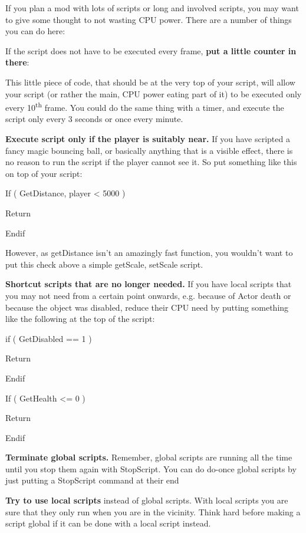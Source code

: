 If you plan a mod with lots of scripts or long and involved scripts, you
may want to give some thought to not wasting CPU power. There are a
number of things you can do here:

If the script does not have to be executed every frame, \textbf{put a
little counter in there}:



This little piece of code, that should be at the very top of your
script, will allow your script (or rather the main, CPU power eating
part of it) to be executed only every 10\textsuperscript{th} frame. You
could do the same thing with a timer, and execute the script only every
3 seconds or once every minute.

\textbf{Execute script only if the player is suitably near.} If you have
scripted a fancy magic bouncing ball, or basically anything that is a
visible effect, there is no reason to run the script if the player
cannot see it. So put something like this on top of your script:

If ( GetDistance, player < 5000 )

Return

Endif

However, as getDistance isn't an amazingly fast function, you wouldn't
want to put this check above a simple getScale, setScale script.

\textbf{Shortcut scripts that are no longer needed.} If you have local
scripts that you may not need from a certain point onwards, e.g. because
of Actor death or because the object was disabled, reduce their CPU need
by putting something like the following at the top of the script:

if ( GetDisabled == 1 )

Return

Endif

If ( GetHealth <= 0 )

Return

Endif

\textbf{Terminate global scripts.} Remember, global scripts are running
all the time until you stop them again with StopScript. You can do
do-once global scripts by just putting a StopScript command at their end



\textbf{Try to use local scripts} instead of global scripts. With local
scripts you are sure that they only run when you are in the vicinity.
Think hard before making a script global if it can be done with a local
script instead.

